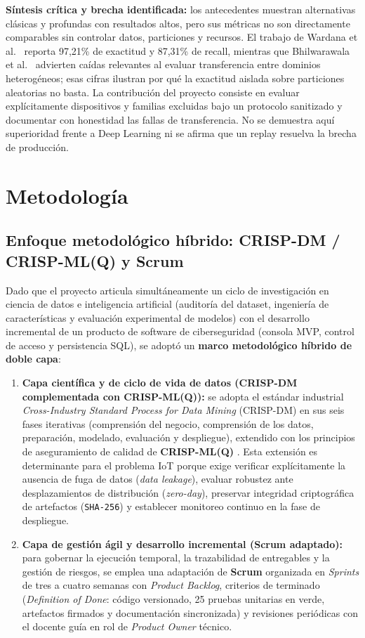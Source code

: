\documentclass[11pt,a4paper]{article}
\begin{document}
\textbf{Síntesis crítica y brecha identificada:} los antecedentes muestran alternativas clásicas y profundas con resultados altos, pero sus métricas no son directamente comparables sin controlar datos, particiones y recursos. El trabajo de Wardana et al.\ \cite{ensembledn} reporta 97,21\% de exactitud y 87,31\% de recall, mientras que Bhilwarawala et al.\ \cite{bridge2026} advierten caídas relevantes al evaluar transferencia entre dominios heterogéneos; esas cifras ilustran por qué la exactitud aislada sobre particiones aleatorias no basta. La contribución del proyecto consiste en evaluar explícitamente dispositivos y familias excluidas bajo un protocolo sanitizado y documentar con honestidad las fallas de transferencia. No se demuestra aquí superioridad frente a Deep Learning ni se afirma que un replay resuelva la brecha de producción.

\section{Metodología}

\subsection{Enfoque metodológico híbrido: CRISP-DM / CRISP-ML(Q) y Scrum}
Dado que el proyecto articula simultáneamente un ciclo de investigación en ciencia de datos e inteligencia artificial (auditoría del dataset, ingeniería de características y evaluación experimental de modelos) con el desarrollo incremental de un producto de software de ciberseguridad (consola MVP, control de acceso y persistencia SQL), se adoptó un \textbf{marco metodológico híbrido de doble capa}:
\begin{enumerate}
  \item \textbf{Capa científica y de ciclo de vida de datos (CRISP-DM complementada con CRISP-ML(Q)):} se adopta el estándar industrial \textit{Cross-Industry Standard Process for Data Mining} (CRISP-DM) \cite{chapman2000crispdm} en sus seis fases iterativas (comprensión del negocio, comprensión de los datos, preparación, modelado, evaluación y despliegue), extendido con los principios de aseguramiento de calidad de \textbf{CRISP-ML(Q)} \cite{studer2021crispmlq}. Esta extensión es determinante para el problema IoT porque exige verificar explícitamente la ausencia de fuga de datos (\textit{data leakage}), evaluar robustez ante desplazamientos de distribución (\textit{zero-day}), preservar integridad criptográfica de artefactos (\texttt{SHA-256}) y establecer monitoreo continuo en la fase de despliegue.
  \item \textbf{Capa de gestión ágil y desarrollo incremental (Scrum adaptado):} para gobernar la ejecución temporal, la trazabilidad de entregables y la gestión de riesgos, se emplea una adaptación de \textbf{Scrum} \cite{schwaber2020scrum} organizada en \textit{Sprints} de tres a cuatro semanas con \textit{Product Backlog}, criterios de terminado (\textit{Definition of Done}: código versionado, 25 pruebas unitarias en verde, artefactos firmados y documentación sincronizada) y revisiones periódicas con el docente guía en rol de \textit{Product Owner} técnico.
\end{enumerate}
\end{document}
